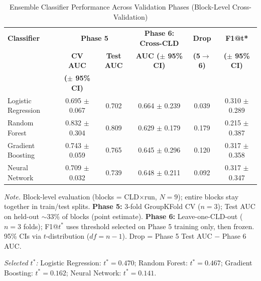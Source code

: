 \begin{table}[H]
\centering
\small
\begin{threeparttable}
\caption{Ensemble Classifier Performance Across Validation Phases (Block-Level Cross-Validation)}
\label{tab:rq2_ensemble_performance}
\setlength{\tabcolsep}{2pt}
\begin{tabular}{lccccc}
\toprule
\textbf{Classifier} & \multicolumn{2}{c}{\textbf{Phase 5}} & \textbf{Phase 6: Cross-CLD} & \textbf{Drop} & \textbf{F1@t*} \\
 & \textbf{CV AUC} & \textbf{Test AUC} & \textbf{AUC ($\pm$ 95\% CI)} & \textbf{(5$\rightarrow$6)} & \textbf{($\pm$ 95\% CI)} \\
 & \textbf{($\pm$ 95\% CI)} &  &  &  &  \\
\midrule
Logistic Regression & 0.695 $\pm$ 0.067 & 0.702 & 0.664 $\pm$ 0.239 & 0.039 & 0.310 $\pm$ 0.289 \\
\midrule
Random Forest & 0.832 $\pm$ 0.304 & 0.809 & 0.629 $\pm$ 0.179 & 0.179 & 0.215 $\pm$ 0.387 \\
\midrule
Gradient Boosting & 0.743 $\pm$ 0.059 & 0.765 & 0.645 $\pm$ 0.296 & 0.120 & 0.317 $\pm$ 0.358 \\
\midrule
Neural Network & 0.709 $\pm$ 0.032 & 0.739 & 0.648 $\pm$ 0.211 & 0.092 & 0.317 $\pm$ 0.347 \\
\bottomrule
\end{tabular}
\begin{tablenotes}
\small
\item \textit{Note.} Block-level evaluation (blocks = CLD$\times$run, $N=9$); entire blocks stay together in train/test splits. \textbf{Phase 5:} 3-fold GroupKFold CV ($n=3$); Test AUC on held-out $\sim$33\% of blocks (point estimate). \textbf{Phase 6:} Leave-one-CLD-out ($n=3$ folds); F1@$t^*$ uses threshold selected on Phase 5 training only, then frozen. 95\% CIs via $t$-distribution ($df=n-1$). Drop = Phase 5 Test AUC $-$ Phase 6 AUC.
\item \textit{Selected $t^*$:} Logistic Regression: $t^*=0.470$; Random Forest: $t^*=0.467$; Gradient Boosting: $t^*=0.162$; Neural Network: $t^*=0.141$.
\end{tablenotes}
\end{threeparttable}
\end{table}
